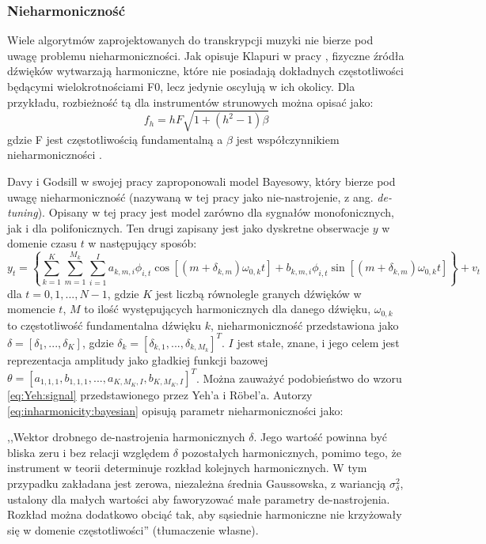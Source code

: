 \documentclass[12pt,a4paper,twoside]{mwart}
\begin{document}
\subsubsection{Nieharmoniczność} \label{sec:multif0:inh:model}
Wiele algorytmów zaprojektowanych do transkrypcji muzyki nie bierze pod uwagę problemu nieharmoniczności. Jak opisuje Klapuri w pracy \cite[806-808]{Transcription:Klapuri:MultipleFundamentalFrequencyEstimation}, fizyczne źródła dźwięków wytwarzają harmoniczne, które nie posiadają dokładnych częstotliwości będącymi wielokrotnościami F0, lecz jedynie oscylują w ich okolicy. Dla przykładu, rozbieżność tą dla instrumentów strunowych można opisać jako:
\begin{equation}\label{eq:inharmonicity:strings}
  f_h = hF \sqrt{1 + (h^2 - 1) \beta}
\end{equation}
gdzie F jest częstotliwością fundamentalną a $\beta$ jest współczynnikiem nieharmoniczności \cite[807]{Transcription:Klapuri:MultipleFundamentalFrequencyEstimation}.

Davy i Godsill w swojej pracy \cite[1-10]{Transcription:BayesianHarmonicModels} zaproponowali model Bayesowy, który bierze pod uwagę nieharmoniczność (nazywaną w tej pracy jako nie-nastrojenie, z ang. \textit{de-tuning}). Opisany w tej pracy jest model zarówno dla sygnałów monofonicznych, jak i dla polifonicznych. Ten drugi zapisany jest jako dyskretne obserwacje $y$ w domenie czasu $t$ w następujący sposób:
\begin{equation}\label{eq:inharmonicity:bayesian}
  y_t = \left\{ \sum_{k=1}^{K}\sum_{m=1}^{M_k}\sum_{i=1}^{I} a_{k,m,i} \phi_{i,t}\cos[(m + \delta_{k,m})\omega_{0,k}t] + b_{k,m,i}\phi_{i,t}\sin[(m + \delta_{k,m})\omega_{0,k}t]\right\} + v_t
\end{equation}
dla $t = 0,1,...,N-1$, gdzie $K$ jest liczbą równolegle granych dźwięków w momencie $t$, $M$ to ilość występujących harmonicznych dla danego dźwięku, $\omega_{0,k}$ to częstotliwość fundamentalna dźwięku $k$, nieharmoniczność przedstawiona jako $\delta = [\delta_1, ..., \delta_K]$, gdzie $\delta_k = [\delta_{k,1}, ..., \delta_{k, M_{k}}]^T$. $I$ jest stałe, znane, i jego celem jest reprezentacja amplitudy jako gładkiej funkcji bazowej $\theta = [a_{1,1,1}, b_{1,1,1}, ..., a_{K, M_{K},I}, b_{K, M_{K},I}]^T$. Można zauważyć podobieństwo do wzoru  \ref{eq:Yeh:signal} przedstawionego przez Yeh'a i Röbel'a. Autorzy \ref{eq:inharmonicity:bayesian} opisują parametr nieharmoniczności jako:
\begin{displayquote}
,,Wektor drobnego de-nastrojenia harmonicznych $\delta$. Jego wartość powinna być bliska zeru i bez relacji względem $\delta$ pozostałych harmonicznych, pomimo tego, że instrument w teorii determinuje rozkład kolejnych harmonicznych. W tym przypadku zakładana jest zerowa, niezależna średnia Gaussowska, z wariancją $\sigma_{\delta}^{2}$, ustalony dla małych wartości aby faworyzować małe parametry de-nastrojenia. Rozkład można dodatkowo obciąć tak, aby sąsiednie harmoniczne nie krzyżowały się w domenie częstotliwości'' \cite[9]{Transcription:BayesianHarmonicModels}(tłumaczenie własne).
\end{displayquote}
\end{document}
